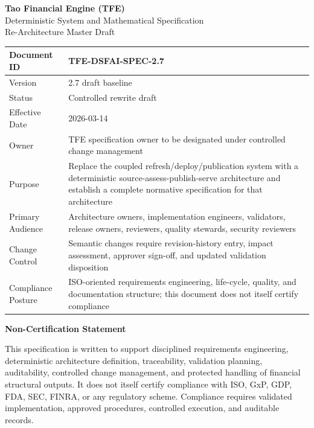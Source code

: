 \documentclass[11pt]{report}
\begin{document}
\begin{titlepage}
\centering
{\Huge \textbf{Tao Financial Engine (TFE)}}\\[0.35cm]
{\LARGE Deterministic System and Mathematical Specification}\\[0.25cm]
{\Large Re-Architecture Master Draft}\\[0.9cm]

\renewcommand{\arraystretch}{1.18}
\begin{tabularx}{\textwidth}{|p{}|Y|}
\hline
Document ID & TFE-DSFAI-SPEC-2.7 \\\hline
Version & 2.7 draft baseline \\\hline
Status & Controlled rewrite draft \\\hline
Effective Date & 2026-03-14 \\\hline
Owner & TFE specification owner to be designated under controlled change management \\\hline
Purpose & Replace the coupled refresh/deploy/publication system with a deterministic source-assess-publish-serve architecture and establish a complete normative specification for that architecture \\\hline
Primary Audience & Architecture owners, implementation engineers, validators, release owners, reviewers, quality stewards, security reviewers \\\hline
Change Control & Semantic changes require revision-history entry, impact assessment, approver sign-off, and updated validation disposition \\\hline
Compliance Posture & ISO-oriented requirements engineering, life-cycle, quality, and documentation structure; this document does not itself certify compliance \\\hline
\end{tabularx}

\vfill
{\large \textbf{Non-Certification Statement}}\\[0.2cm]
\parbox{0.93\textwidth}{This specification is written to support disciplined requirements engineering, deterministic architecture definition, traceability, validation planning, auditability, controlled change management, and protected handling of financial structural outputs. It does not itself certify compliance with ISO, GxP, GDP, FDA, SEC, FINRA, or any regulatory scheme. Compliance requires validated implementation, approved procedures, controlled execution, and auditable records.}
\vfill
\end{titlepage}
\end{document}
